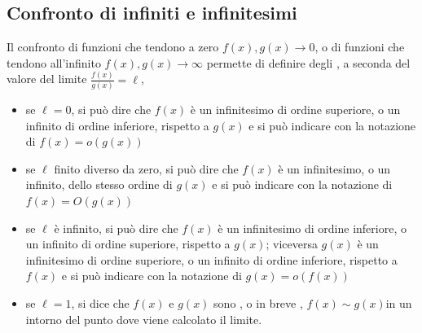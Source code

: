 \documentclass[letterpaper,10pt,italian]{jupyterBook}
\begin{document}
\subsection{Confronto di infiniti e infinitesimi}
\label{\detokenize{ch/infinitesimal_calculus/analysis:confronto-di-infiniti-e-infinitesimi}}\label{\detokenize{ch/infinitesimal_calculus/analysis:infinitesimal-calculus-limits-infinite-simal}}
\sphinxAtStartPar
Il confronto di funzioni che tendono a zero \(f(x), g(x) \rightarrow 0\), o di funzioni che tendono all’infinito \(f(x), g(x) \rightarrow \infty\) permette di definire degli   , a seconda del valore del limite \(\frac{f(x)}{g(x)} = \ell\),
\begin{itemize}
\item {} 
\sphinxAtStartPar
se \(\ell = 0\), si può dire che \(f(x)\) è un infinitesimo di ordine superiore, o un infinito di ordine inferiore, rispetto a \(g(x)\) e si può indicare con la notazione di  \(f(x) = o \left(g(x) \right)\)

\item {} 
\sphinxAtStartPar
se \(\ell\) finito diverso da zero, si può dire che \(f(x)\) è un infinitesimo, o un infinito,  dello stesso ordine di \(g(x)\) e si può indicare con la notazione di  \(f(x) = O \left(g(x) \right)\)

\item {} 
\sphinxAtStartPar
se \(\ell\) è infinito, si può dire che \(f(x)\) è un infinitesimo di ordine inferiore, o un infinito di ordine superiore, rispetto a \(g(x)\); viceversa \(g(x)\) è un infinitesimo di ordine superiore, o un infinito di ordine inferiore, rispetto a \(f(x)\) e si può indicare con la notazione di  \(g(x) = o \left(f(x) \right)\)

\item {} 
\sphinxAtStartPar
se \(\ell = 1\), si dice che \(f(x)\) e \(g(x)\) sono , o in breve , \(f(x) \sim g(x)\)in un intorno del punto dove viene calcolato il limite.

\end{itemize}
\end{document}
